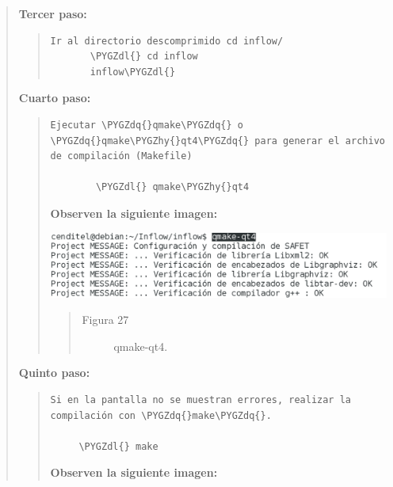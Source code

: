 \documentclass[letterpaper,11pt,spanish]{sphinxmanual}
\def\PYGZdl{\char`\$}
\def\PYGZhy{\char`\-}
\def\PYGZdq{\char`\"}
\begin{document}
\begin{quote}
\begin{quote}
\begin{quote}
\begin{description}
\end{description}\end{quote}
\end{quote}

\textbf{Tercer paso:}
\begin{quote}

\begin{Verbatim}[commandchars=\\\{\}]
Ir al directorio descomprimido cd inflow/
       \PYGZdl{} cd inflow
       inflow\PYGZdl{}
\end{Verbatim}
\end{quote}

\textbf{Cuarto paso:}
\begin{quote}

\begin{Verbatim}[commandchars=\\\{\}]
Ejecutar \PYGZdq{}qmake\PYGZdq{} o \PYGZdq{}qmake\PYGZhy{}qt4\PYGZdq{} para generar el archivo de compilación (Makefile)

        \PYGZdl{} qmake\PYGZhy{}qt4
\end{Verbatim}

\textbf{Observen la siguiente imagen:}

\includegraphics{inflow2.png}
\begin{quote}\begin{description}
\item[{Figura 27}] \leavevmode
qmake-qt4.

\end{description}\end{quote}
\end{quote}

\textbf{Quinto paso:}
\begin{quote}

\begin{Verbatim}[commandchars=\\\{\}]
Si en la pantalla no se muestran errores, realizar la compilación con \PYGZdq{}make\PYGZdq{}.

     \PYGZdl{} make
\end{Verbatim}

\textbf{Observen la siguiente imagen:}


\end{quote}
\end{quote}
\end{document}
